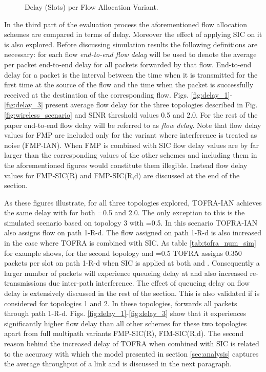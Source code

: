 \documentclass[conference]{IEEEtran}
\begin{document}
\begin{figure}[!t]
\centering
{}
\label{fig:delay}
\caption{Delay (Slots) per Flow Allocation Variant. }
\end{figure}

In the third part of the evaluation process the aforementioned flow allocation schemes are compared in terms of delay.
Moreover the effect of applying SIC on it is also explored. Before discussing simulation results the following definitions are necessary:
for each flow \textit{end-to-end flow delay} will be used to denote the average per packet end-to-end delay for all packets forwarded by that flow.
End-to-end delay for a packet is the interval between the time when it is transmitted for the first time at the source of the flow and the time
when the packet is successfully received at the destination of the corresponding flow.
Figs. \ref{fig:delay_1}-\ref{fig:delay_3} present average flow delay for the three topologies described in Fig.
\ref{fig:wireless_scenario} and SINR threshold values 0.5 and 2.0. For the rest of the paper end-to-end flow
delay will be referred to as \textit{flow delay}. Note that flow delay values for FMP are included only for the variant
where interference is treated as noise (FMP-IAN). When FMP is combined with SIC flow delay values are by far larger
than the corresponding values of the other schemes and including them in the aforementioned figures would constitute them illegible.
Instead flow delay values for FMP-SIC(R) and FMP-SIC(R,d) are discussed at the end of the section.

As these figures illustrate, for all three topologies explored, TOFRA-IAN achieves the same delay with  for both =0.5 and 2.0.
The only exception to this is the simulated scenario based on topology 3 with =0.5. In this scenario TOFRA-IAN also assigns flow on path 1-R-d.
The flow assigned on path 1-R-d is also increased in the case where TOFRA is combined with SIC. As table \ref{tab:tofra_num_sim}
for example shows, for the second topology and =0.5 TOFRA assigns 0.350 packets per slot on path 1-R-d when SIC is applied at both  and .
Consequently a larger number of packets will experience queueing delay at  and also increased re-transmissions due inter-path interference.
The effect of queueing delay on flow delay is extensively discussed in the rest of the section.
This is also validated if  is considered for topologies 1 and 2.
In these topologies,  forwards all packets through path 1-R-d. Figs. \ref{fig:delay_1}-\ref{fig:delay_3} show that it experiences
significantly higher flow delay than all other schemes for these two topologies apart from full multipath variants FMP-SIC(R), FIM-SIC(R,d).
The second reason behind the increased delay of TOFRA when combined with SIC is related to the accuracy with which the model presented
in section \ref{sec:analysis} captures the average throughput of a link and is discussed in the next paragraph.
\end{document}
